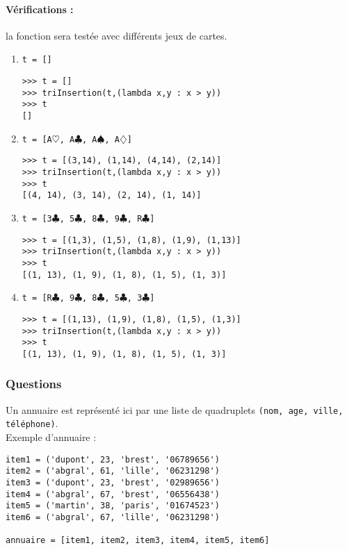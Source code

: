 \paragraph{Vérifications :} la fonction sera testée avec différents jeux de cartes.
\begin{enumerate}
\item \texttt{t = []}
\begin{Verbatim}
>>> t = []
>>> triInsertion(t,(lambda x,y : x > y))
>>> t
[]
\end{Verbatim}
\item \texttt{t = [A$\heartsuit$, A$\clubsuit$, A$\spadesuit$, A$\diamondsuit$]}
\begin{Verbatim}
>>> t = [(3,14), (1,14), (4,14), (2,14)]
>>> triInsertion(t,(lambda x,y : x > y))
>>> t
[(4, 14), (3, 14), (2, 14), (1, 14)]
\end{Verbatim}

\item \texttt{t = [3$\clubsuit$, 5$\clubsuit$, 8$\clubsuit$, 9$\clubsuit$, R$\clubsuit$]}
\begin{Verbatim}
>>> t = [(1,3), (1,5), (1,8), (1,9), (1,13)]
>>> triInsertion(t,(lambda x,y : x > y))
>>> t
[(1, 13), (1, 9), (1, 8), (1, 5), (1, 3)]
\end{Verbatim}

\item \texttt{t = [R$\clubsuit$, 9$\clubsuit$, 8$\clubsuit$, 5$\clubsuit$, 3$\clubsuit$]}
\begin{Verbatim}
>>> t = [(1,13), (1,9), (1,8), (1,5), (1,3)]
>>> triInsertion(t,(lambda x,y : x > y))
>>> t
[(1, 13), (1, 9), (1, 8), (1, 5), (1, 3)]
\end{Verbatim}
\end{enumerate}

\subsubsection{Questions}
Un annuaire est représenté ici par une liste de quadruplets 
\texttt{(nom, age, ville, téléphone)}.\\
Exemple d'annuaire :
\begin{minipage}[t]{7cm}
\begin{Verbatim}
item1 = ('dupont', 23, 'brest', '06789656')
item2 = ('abgral', 61, 'lille', '06231298')
item3 = ('dupont', 23, 'brest', '02989656')
item4 = ('abgral', 67, 'brest', '06556438')
item5 = ('martin', 38, 'paris', '01674523')
item6 = ('abgral', 67, 'lille', '06231298')

annuaire = [item1, item2, item3, item4, item5, item6]
\end{Verbatim}
\end{minipage}
\vspace*{3mm}

